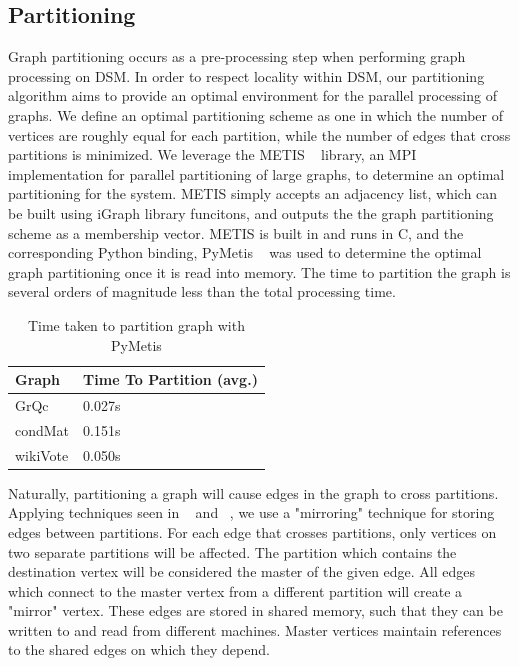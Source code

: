 \subsection{Partitioning}

Graph partitioning occurs as a pre-processing step when performing graph processing
on DSM. In order to respect locality within DSM, our partitioning algorithm aims to 
provide an optimal environment for the parallel processing of graphs. We define an 
optimal partitioning scheme as one in which the number of vertices are roughly 
equal for each partition, while the number of edges that cross partitions is 
minimized. We leverage the METIS ~\cite{Lasalle:2013:metis} library, an MPI 
implementation for parallel partitioning of large graphs, to determine an optimal 
partitioning for the system. METIS simply accepts an adjacency list, which can be 
built using iGraph library funcitons, and outputs the the graph partitioning
scheme as a membership vector. METIS is built in and runs in C, and the corresponding
Python binding, PyMetis ~\cite{pymetis} was used to determine the optimal graph 
partitioning once it is read into memory. The time to partition the graph is
several orders of magnitude less than the total processing time.

\begin{table}[h]
\begin{tabularx}{\linewidth}{|X|X|}
\hline
Graph & Time To Partition (avg.) \\ \hline \hline
GrQc & 0.027s \\ \hline
condMat & 0.151s \\ \hline
wikiVote & 0.050s \\ \hline
\end{tabularx}
\caption{Time taken to partition graph with PyMetis}
\end{table}

Naturally, partitioning a graph will cause edges in the graph to cross 
partitions. Applying techniques seen in ~\cite{Tian:2013:thinklikeagraph} and 
~\cite{Chen:2015:powerlyra}, we use a "mirroring" technique for storing edges
between partitions. For each edge that crosses partitions, only vertices on 
two separate partitions will be affected. The partition which contains the 
destination vertex will be considered the master of the given edge. All edges 
which connect to the master vertex from a different partition will create a
"mirror" vertex. These edges are stored in shared memory, such that they can
be written to and read from different machines. Master vertices maintain 
references to the shared edges on which they depend.

